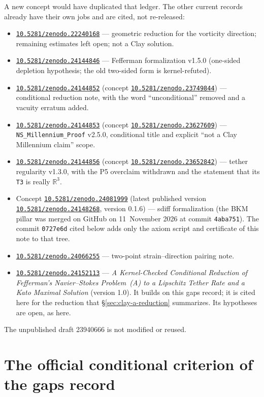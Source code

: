 \documentclass[11pt]{article}
\theoremstyle{plain}
\theoremstyle{definition}
\theoremstyle{remark}
\newcommand{\R}{\mathbb{R}}
\newcommand{\doi}[1]{\href{https://doi.org/#1}{\texttt{#1}}}
\newcommand{\sdiffsha}{0727e6d}
\begin{document}
A new concept would have duplicated that ledger. The other current records already have their own jobs and are cited, not re-released:
\begin{itemize}[leftmargin=1.4em]
\item \doi{10.5281/zenodo.22240168} --- geometric reduction for the vorticity direction; remaining estimates left open; not a Clay solution.
\item \doi{10.5281/zenodo.24144846} --- Fefferman formalization v1.5.0 (one-sided depletion hypothesis; the old two-sided form is kernel-refuted).
\item \doi{10.5281/zenodo.24144852} (concept \doi{10.5281/zenodo.23749844}) --- conditional reduction note, with the word ``unconditional'' removed and a vacuity erratum added.
\item \doi{10.5281/zenodo.24144853} (concept \doi{10.5281/zenodo.23627609}) --- \texttt{NS\_\hspace{0pt}Millennium\_\hspace{0pt}Proof} v2.5.0, conditional title and explicit ``not a Clay Millennium claim'' scope.
\item \doi{10.5281/zenodo.24144856} (concept \doi{10.5281/zenodo.23652842}) --- tether regularity v1.3.0, with the P5 overclaim withdrawn and the statement that its \texttt{T3} is really \(\R^{3}\).
\item Concept \doi{10.5281/zenodo.24081999} (latest published version \doi{10.5281/zenodo.24148268}, version 0.1.6) --- sdiff formalization (the BKM pillar was merged on GitHub on 11~November 2026 at commit \texttt{4aba751}). The commit \texttt{\sdiffsha} cited below adds only the axiom script and certificate of this note to that tree.
\item \doi{10.5281/zenodo.24066255} --- two-point strain--direction pairing note.
\item \doi{10.5281/zenodo.24152113} --- \emph{A Kernel-Checked Conditional Reduction of Fefferman's Navier--Stokes Problem~(A) to a Lipschitz Tether Rate and a Kato Maximal Solution} (version 1.0). It builds on this gaps record; it is cited here for the reduction that \S\ref{sec:clay-a-reduction} summarizes. Its hypotheses are open, as here.
\end{itemize}
The unpublished draft 23940666 is not modified or reused.

\section{The official conditional criterion of the gaps record}
\end{document}
